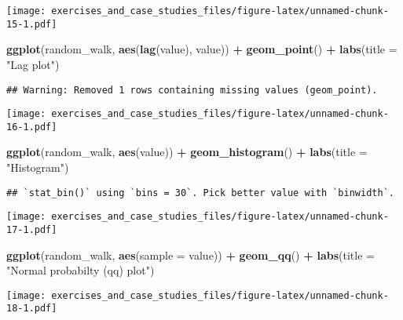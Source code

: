 \documentclass[]{book}
\newenvironment{Shaded}{\begin{snugshade}}{\end{snugshade}}
\newcommand{\DataTypeTok}[1]{\textcolor[rgb]{0.13,0.29,0.53}{#1}}
\newcommand{\KeywordTok}[1]{\textcolor[rgb]{0.13,0.29,0.53}{\textbf{#1}}}
\newcommand{\NormalTok}[1]{#1}
\newcommand{\OperatorTok}[1]{\textcolor[rgb]{0.81,0.36,0.00}{\textbf{#1}}}
\newcommand{\StringTok}[1]{\textcolor[rgb]{0.31,0.60,0.02}{#1}}
\theoremstyle{definition}
\theoremstyle{definition}
\theoremstyle{definition}
\theoremstyle{remark}
\begin{document}
\texttt{[image: exercises\_and\_case\_studies\_files/figure-latex/unnamed-chunk-15-1.pdf]}

\begin{Shaded}
\begin{Highlighting}[]
\KeywordTok{ggplot}\NormalTok{(random_walk, }\KeywordTok{aes}\NormalTok{(}\KeywordTok{lag}\NormalTok{(value), value)) }\OperatorTok{+}
\StringTok{  }\KeywordTok{geom_point}\NormalTok{() }\OperatorTok{+}
\StringTok{  }\KeywordTok{labs}\NormalTok{(}\DataTypeTok{title =} \StringTok{"Lag plot"}\NormalTok{)}
\end{Highlighting}
\end{Shaded}

\begin{verbatim}
## Warning: Removed 1 rows containing missing values (geom_point).
\end{verbatim}

\texttt{[image: exercises\_and\_case\_studies\_files/figure-latex/unnamed-chunk-16-1.pdf]}

\begin{Shaded}
\begin{Highlighting}[]
\KeywordTok{ggplot}\NormalTok{(random_walk, }\KeywordTok{aes}\NormalTok{(value)) }\OperatorTok{+}
\StringTok{  }\KeywordTok{geom_histogram}\NormalTok{() }\OperatorTok{+}
\StringTok{  }\KeywordTok{labs}\NormalTok{(}\DataTypeTok{title =} \StringTok{"Histogram"}\NormalTok{)}
\end{Highlighting}
\end{Shaded}

\begin{verbatim}
## `stat_bin()` using `bins = 30`. Pick better value with `binwidth`.
\end{verbatim}

\texttt{[image: exercises\_and\_case\_studies\_files/figure-latex/unnamed-chunk-17-1.pdf]}

\begin{Shaded}
\begin{Highlighting}[]
\KeywordTok{ggplot}\NormalTok{(random_walk, }\KeywordTok{aes}\NormalTok{(}\DataTypeTok{sample =}\NormalTok{ value)) }\OperatorTok{+}
\StringTok{  }\KeywordTok{geom_qq}\NormalTok{() }\OperatorTok{+}
\StringTok{  }\KeywordTok{labs}\NormalTok{(}\DataTypeTok{title =} \StringTok{"Normal probabilty (qq) plot"}\NormalTok{)}
\end{Highlighting}
\end{Shaded}

\texttt{[image: exercises\_and\_case\_studies\_files/figure-latex/unnamed-chunk-18-1.pdf]}
\end{document}
